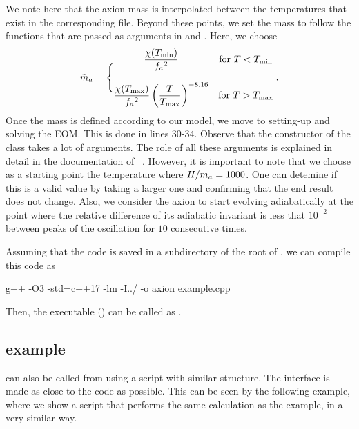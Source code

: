 \documentclass[a4paper,11pt]{article}
\begin{document}
	\lstset{language = c++}
	
	
	
	We note here that the axion mass is interpolated between the temperatures that exist in the corresponding file. Beyond these points, we set the mass to follow the functions
	that are passed as arguments in  and .  Here, we choose
	\begin{equation}
		\tilde m_{a}{} = \Bigg\{
		\begin{matrix}
			\dfrac{\chi(T_{\rm min})}{f_{a}{}^2} & \text{for } T<T_{\rm min} 
			\\ \\
			\dfrac{\chi(T_{\rm max})}{f_{a}{}^2}   \left( \dfrac{T}{T_{\rm max}} \right)^{-8.16} & \text{for } T>T_{\rm max} 
		\end{matrix} \;.
		\label{eq:axM-limits}
	\end{equation}
	Once the mass is defined according to our model, we move to setting-up and solving the EOM. This is done in lines $30$-$34$. Observe that the constructor of the  class takes a lot of arguments. The role of all these arguments is explained in detail in the documentation of \mimes~\cite{Karamitros:2021nxi}. However, it is important to note that we choose as a starting point the temperature where $H/m_{a}{} = 1000$. One can detemine if this is a valid value by taking a larger one and confirming that the end result does not change.
	 Also, we consider the axion to start evolving adiabatically at the point where the relative difference of its adiabatic invariant is less that $10^{-2}$ between peaks of the oscillation for $10$ consecutive times.
	 
	 Assuming that the code is saved in a subdirectory of the root of \mimes, we can compile this code as 
	 \begin{bash}
	 	g++ -O3 -std=c++17 -lm -I../ -o axion example.cpp
	 \end{bash}
	Then, the executable () can be called as .
	
	
	\subsection{\PY example}
	\mimes can also be called from \PY using a script with similar structure. The \PY interface is made as close to the \CPP code as possible. This can be seen by the following example, where 
	we show a \PY script that performs the same calculation as the \CPP example, in a very similar way.
	
\end{document}
